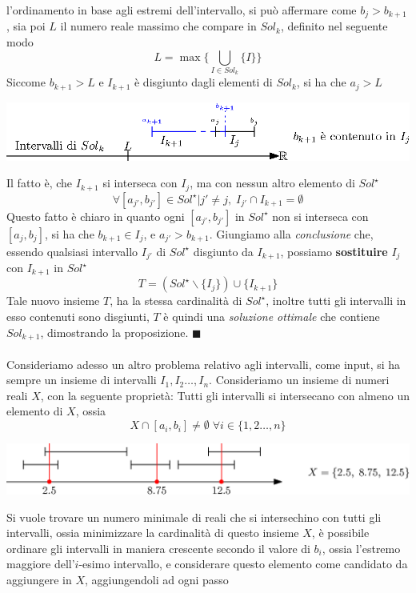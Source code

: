 \documentclass[12pt, letterpaper]{article}
\newcommand{\acc}{\\\hphantom{}\\}
\begin{document}
l'ordinamento in base agli estremi dell'intervallo, si può affermare come $b_j>b_{k+1}$, sia poi
$L$ il numero reale massimo che compare in $Sol_k$, definito nel seguente modo
$$ L=\max\{\bigcup_{I\in Sol_k}\{I\}\}$$
Siccome $b_{k+1}>L$ e $I_{k+1}$ è disgiunto dagli elementi di $Sol_k$, si ha che $a_j>L$
\begin{center}
    \includegraphics[width=1\textwidth ]{images/dimPropIntervalli2.eps}
\end{center}
Il fatto è, che $I_{k+1}$ si interseca con $I_j$, ma con nessun altro elemento di $Sol^\star$
$$ \forall [a_{j'},b_{j'}]\in Sol^\star | j'\ne j, \; I_{j'}\cap I_{k+1}=\emptyset$$
Questo fatto è chiaro in quanto ogni $[a_{j'},b_{j'}]$ in $Sol^\star$ non si interseca con $[a_j,b_j]$, si ha che
$b_{k+1}\in I_j$, e $a_{j'}>b_{k+1}$. Giungiamo alla \textit{conclusione} che, essendo qualsiasi intervallo $I_{j'}$ di
$Sol^\star$ disgiunto da $I_{k+1}$, possiamo \textbf{sostituire} $I_j$ con $I_{k+1}$ in $Sol^\star$
$$ T=(Sol^\star \backslash \{I_j\})\cup \{I_{k+1}\}$$
Tale nuovo insieme $T$, ha la stessa cardinalità di $Sol^\star$, inoltre tutti gli intervalli in esso contenuti sono
disgiunti, $T$ è quindi una \textit{soluzione ottimale} che contiene $Sol_{k+1}$, dimostrando la proposizione. $\blacksquare$\acc
Consideriamo adesso un altro problema relativo agli intervalli, come input, si ha sempre un insieme di
intervalli $I_1,I_2\dots,I_n$. Consideriamo un insieme di numeri reali $X$, con la seguente proprietà: Tutti gli intervalli
si intersecano con almeno un elemento di $X$, ossia $$X\cap [a_i,b_i]\ne \emptyset\; \forall i\in\{1,2\dots,n\}$$
\begin{center}
    \includegraphics[width=1\textwidth ]{images/midPointInterset.eps}
\end{center}
Si vuole trovare un numero minimale di reali che si intersechino con tutti gli intervalli, ossia minimizzare la cardinalità
di questo insieme $X$, è possibile ordinare gli intervalli in maniera crescente secondo il valore di $b_i$, ossia l'estremo
maggiore dell'$i$-esimo intervallo, e considerare questo elemento come candidato da aggiungere in $X$, aggiungendoli ad ogni passo
\end{document}
